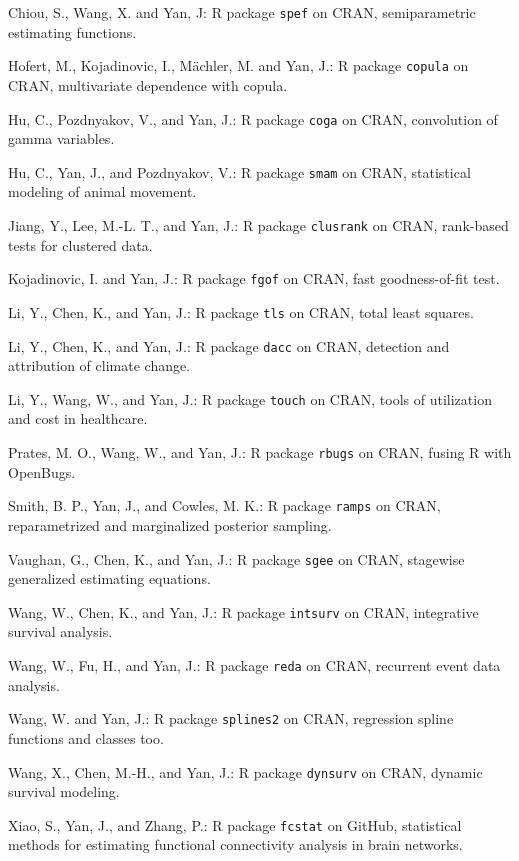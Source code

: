 \documentclass[Statistics]{vita}
\begin{document}
\begin{vita}
\begin{Publications}
\begin{Software}
  \item *Chiou, S., Wang, X. and Yan, J: R package \texttt{spef} on CRAN, semiparametric estimating functions.
  \item Hofert, M., Kojadinovic, I.,  M\"achler, M. and Yan, J.: R package \texttt{copula} on CRAN, multivariate dependence with copula.
  \item *Hu, C., Pozdnyakov, V., and Yan, J.: R package \texttt{coga} on CRAN, convolution of gamma variables.
  \item *Hu, C., Yan, J., and Pozdnyakov, V.: R package \texttt{smam} on CRAN, statistical modeling of animal movement. 
  \item *Jiang, Y., Lee, M.-L. T., and Yan, J.: R package \texttt{clusrank} on CRAN, rank-based tests for clustered data.
  \item Kojadinovic, I. and Yan, J.: R package \texttt{fgof} on CRAN, fast goodness-of-fit test.
  \item *Li, Y., Chen, K., and Yan, J.: R package \texttt{tls} on CRAN, total least squares.
  \item *Li, Y., Chen, K., and Yan, J.: R package \texttt{dacc} on CRAN, detection and attribution of climate change.
  \item *Li, Y., Wang, W., and Yan, J.: R package \texttt{touch} on CRAN, tools of utilization and cost in healthcare.
  \item *Prates, M. O., Wang, W., and Yan, J.: R package \texttt{rbugs} on CRAN, fusing R with OpenBugs.
  \item Smith, B. P., Yan, J., and Cowles, M. K.: R package \texttt{ramps} on CRAN, reparametrized and marginalized posterior sampling.
  \item *Vaughan, G., Chen, K., and Yan, J.: R package \texttt{sgee} on CRAN, stagewise generalized estimating equations.
  \item *Wang, W., Chen, K., and Yan, J.: R package \texttt{intsurv} on CRAN, integrative survival analysis.
  \item *Wang, W., Fu, H., and Yan, J.: R package \texttt{reda} on CRAN, recurrent event data analysis.
  \item *Wang, W. and Yan, J.: R package \texttt{splines2} on CRAN, regression spline functions and classes too.
  \item *Wang, X., Chen, M.-H., and Yan, J.: R package \texttt{dynsurv} on CRAN, dynamic survival modeling.
  \item *Xiao, S., Yan, J., and Zhang, P.: R package \texttt{fcstat} on GitHub, statistical methods for estimating functional connectivity analysis in brain networks.

\end{Software}
\end{Publications}
\end{vita}
\end{document}
